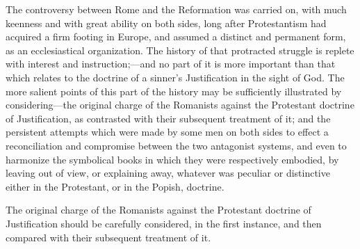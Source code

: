 \documentclass[
]{book}
\begin{document}
The controversy between Rome and the Reformation was carried on, with much keenness and with great ability on both sides, long after Protestantism had acquired a firm footing in Europe, and assumed a distinct and permanent form, as an ecclesiastical organization. The history of that protracted struggle is replete with interest and instruction;---and no part of it is more important than that which relates to the doctrine of a sinner's Justification in the sight of God. The more salient points of this part of the history may be sufficiently illustrated by considering---the original charge of the Romanists against the Protestant doctrine of Justification, as contrasted with their subsequent treatment of it; and the persistent attempts which were made by some men on both sides to effect a reconciliation and compromise between the two antagonist systems, and even to harmonize the symbolical books in which they were respectively embodied, by leaving out of view, or explaining away, whatever was peculiar or distinctive either in the Protestant, or in the Popish, doctrine.

The original charge of the Romanists against the Protestant doctrine of Justification should be carefully considered, in the first instance, and then compared with their subsequent treatment of it.
\end{document}
